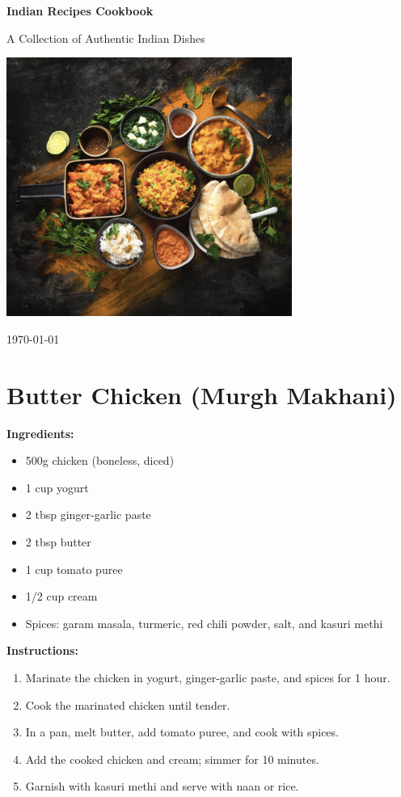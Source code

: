\documentclass[12pt]{article}
\begin{document}
\begin{titlepage}
    \centering
    \vspace*{2cm}
    {\Huge\bfseries Indian Recipes Cookbook\par}
    \vspace{1.5cm}
    {\Large A Collection of Authentic Indian Dishes\par}
    \vfill
    \includegraphics[width=0.7\textwidth]{all_food.png} 
    \vfill
    {\large \today\par}
\end{titlepage}


\tableofcontents %
\newpage

\section{Butter Chicken (Murgh Makhani)}
\label{sec:butter_chicken}
\textbf{Ingredients:}
\begin{itemize}
    \item 500g chicken (boneless, diced)
    \item 1 cup yogurt
    \item 2 tbsp ginger-garlic paste
    \item 2 tbsp butter
    \item 1 cup tomato puree
    \item 1/2 cup cream
    \item Spices: garam masala, turmeric, red chili powder, salt, and kasuri methi
\end{itemize}

\textbf{Instructions:}
\begin{enumerate}
    \item Marinate the chicken in yogurt, ginger-garlic paste, and spices for 1 hour.
    \item Cook the marinated chicken until tender.
    \item In a pan, melt butter, add tomato puree, and cook with spices.
    \item Add the cooked chicken and cream; simmer for 10 minutes.
    \item Garnish with kasuri methi and serve with naan or rice.
\end{enumerate}
\end{document}
